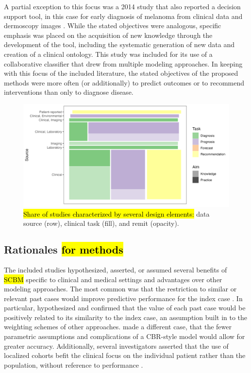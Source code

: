 \documentclass[sn-mathphys,Numbered,pdflatex]{sn-jnl}
\theoremstyle{remark}
\theoremstyle{definition}
\begin{document}
A partial exception to this focus was a 2014 study that also reported a
decision support tool, in this case for early diagnosis of melanoma from
clinical data and dermoscopy images \citep{Nicolas2014}. While the
stated objectives were analogous, specific emphasis was placed on the
acquisition of new knowledge through the development of the tool,
including the systematic generation of new data and creation of a
clinical ontology. This study was included for its use of a
collaborative classifier that drew from multiple modeling approaches. In
keeping with this focus of the included literature, the stated
objectives of the proposed methods were more often (or additionally) to
predict outcomes or to recommend interventions than only to diagnose
disease.

\begin{figure}

{\centering \includegraphics[width=1\linewidth]{Fig3} 

}

\caption{\hl{Share of studies characterized by several design elements:}
 data source (row),
 clinical task (fill), and
 remit (opacity).}\label{fig:properties}
\end{figure}

\subsection{\texorpdfstring{Rationales\hl{ for methods}}{Rationales}}\label{rationales}

The included studies hypothesized, asserted, or assumed several benefits
of \hl{SCBM} specific to clinical and medical settings and advantages
over other modeling approaches. The most common was that the restriction
to similar or relevant past cases would improve predictive performance
for the index case \citep{Mariuzzi1997, Liang2015, Ng2015, Lee2017}. In
particular, \citet{Lee2015} hypothesized and confirmed that the value of
each past case would be positively related to its similarity to the
index case, an assumption built in to the weighting schemes of other
approaches. \citet{Lowsky2013} made a different case, that the fewer
parametric assumptions and complications of a CBR-style model would
allow for greater accuracy. Additionally, several investigators asserted
that the use of localized cohorts befit the clinical focus on the
individual patient rather than the population, without reference to
performance \citep{Song2006, Xu2008}.
\end{document}
